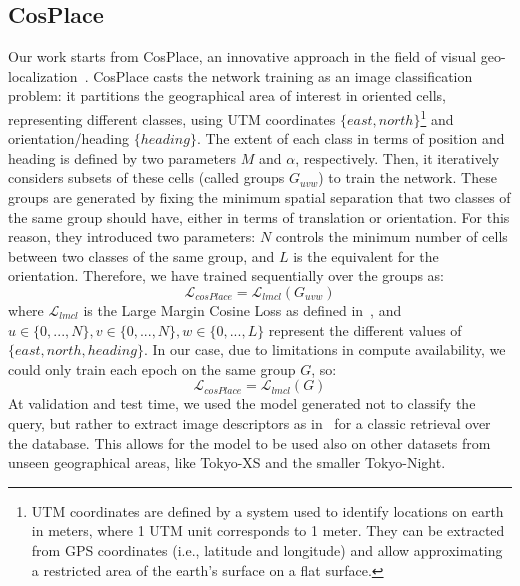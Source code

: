 \documentclass[10pt,twocolumn,letterpaper]{article}
\begin{document}
\subsection{CosPlace}
Our work starts from CosPlace, an innovative approach in the field of visual geo-localization~\cite{Berton_CVPR_2022_CosPlace}. CosPlace casts the network training as an image classification problem: it partitions the geographical area of interest in oriented cells, representing different classes, using UTM coordinates $\{east,north\}$\footnote{UTM coordinates are defined by a system used to identify locations on earth in meters, where 1 UTM unit corresponds to 1 meter. They can be extracted from GPS coordinates (i.e., latitude and longitude) and allow approximating a restricted area of the earth’s surface on a flat surface.} and orientation/heading $\{heading\}$. The extent of each class in terms of position and heading is defined by two parameters $M$ and $\alpha$, respectively. Then, it iteratively considers subsets of these cells (called groups $G_{uvw}$) to train the network.
These groups are generated by fixing the minimum spatial separation that two classes of the same group should have, either in terms of translation or orientation. For this reason, they introduced two parameters: $N$ controls the minimum number of cells between two classes of the same group, and $L$ is the equivalent for the orientation.
Therefore, we have trained sequentially over the groups as:
\begin{equation}
  \mathcal{L}_{cosPlace} = \mathcal{L}_{lmcl}(G_{uvw})
  \label{eq:cosplace_full}
\end{equation}
where $\mathcal{L}_{lmcl}$ is the Large Margin Cosine Loss as defined in~\cite{cosface}, and $u \in \{0,...,N\}, v \in \{0,...,N\}, w \in \{0,...,L\}$ represent the different values of $\{east, north, heading\}$. In our case, due to limitations in compute availability, we could only train each epoch on the same group $G$, so:
\begin{equation}
  \mathcal{L}_{cosPlace} = \mathcal{L}_{lmcl}(G)
  \label{eq:cosplace_our}
\end{equation}
At validation and test time, we used the model generated not to classify the query, but rather to extract image descriptors as in~\cite{cosface} for a classic retrieval over the database. This allows for the model to be used also on other datasets from unseen geographical areas, like Tokyo-XS and the smaller Tokyo-Night.
\end{document}
